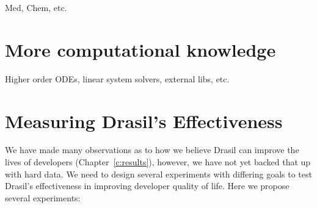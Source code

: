 Med, Chem, etc.

\section{More computational knowledge}

Higher order ODEs, linear system solvers, external libs, etc.

\section{Measuring Drasil's Effectiveness}

We have made many observations as to how we believe Drasil can improve the 
lives of developers (Chapter~\ref{c:results}), however, we have not yet backed 
that up with hard data. We need to design several experiments with differing 
goals to test Drasil's effectiveness in improving developer quality of life. 
Here we propose several experiments:

